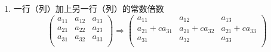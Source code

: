 \begin{enumerate}
\item 一行（列）加上另一行（列）的常数倍数
\begin{equation}
\begin{pmatrix}
        a_{11} & a_{12} & a_{13}\\
        a_{21} & a_{22} & a_{23}\\
        a_{31} & a_{32} & a_{33}\\
\end{pmatrix}
\Rightarrow
\begin{pmatrix}
        a_{11} & a_{12} & a_{13}\\
        a_{21}+ca_{31} & a_{21}+ca_{32} & a_{21}+ca_{33}\\
        a_{31} & a_{32} & a_{33}\\
\end{pmatrix}
\end{equation}
\end{enumerate}

